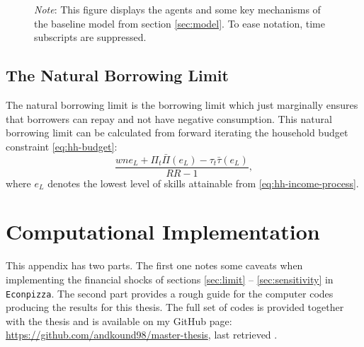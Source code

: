 \documentclass[a4paper,12pt]{article} %
\numberwithin{equation}{section} %
\numberwithin{figure}{section}
\numberwithin{table}{section}
\begin{document}
\begin{refsection}
\begin{appendices}
\begin{figure}[H]
\begin{flushleft}
\footnotesize
\textit{Note}: This figure displays the agents and some key mechanisms of the baseline model from section \ref{sec:model}. To ease notation, time subscripts are suppressed.
\end{flushleft}
\end{figure}

\subsection{The Natural Borrowing Limit}
\label{sec:app-hh-borrowing}
The natural borrowing limit is the borrowing limit which just marginally ensures that borrowers can repay and not have negative consumption. This natural borrowing limit can be calculated from forward iterating the household budget constraint \eqref{eq:hh-budget}:
\begin{equation*}
    \frac{wne_{L} + \Pi_t \bar{\Pi} (e_{L}) - \tau_t \bar{\tau} (e_{L})}{RR - 1},
\end{equation*}
where $e_L$ denotes the lowest level of skills attainable from \eqref{eq:hh-income-process}.

\section{Computational Implementation}
\label{sec-app:codes}

This appendix has two parts. The first one notes some caveats when implementing the financial shocks of sections \ref{sec:limit} -- \ref{sec:sensitivity} in \texttt{Econpizza}. The second part provides a rough guide for the computer codes producing the results for this thesis. The full set of codes is provided together with the thesis and is available on my GitHub page: \url{https://github.com/andkound98/master-thesis}, last retrieved .


\end{appendices}
\end{refsection}
\end{document}
